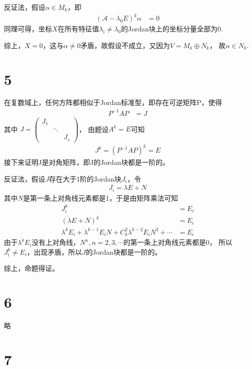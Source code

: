 \documentclass{article}
\begin{document}
反证法，假设$\alpha \in M_k$，即
\begin{align*}
  (\mathscr{A} - \lambda_0 E)^k \alpha & = 0
\end{align*}
同理可得，坐标$X$在所有特征值$\lambda_i \neq \lambda_0$的Jordan块上的坐标分量全部为0.

综上，$X = 0$，这与$\alpha \neq 0$矛盾，故假设不成立，又因为$V = M_k \oplus N_k$，
故$\alpha \in N_k$.

\section*{5}

在复数域上，任何方阵都相似于Jordan标准型，即存在可逆矩阵P，使得
\begin{align*}
  P^{-1} A P & = J
\end{align*}
其中
$J = \begin{pmatrix}
    J_1 &        &     \\
        & \ddots &     \\
        &        & J_s
  \end{pmatrix}$，
由题设$A^k = E$可知
\begin{align*}
  J^k = (P^{-1} A P)^k = E
\end{align*}
接下来证明J是对角矩阵，即J的Jordan块都是一阶的。

反证法，假设$J$存在大于1阶的Jordan块$J_i$，令
\begin{align*}
  J_i = \lambda E + N
\end{align*}
其中$N$是第一条上对角线元素都是1，于是由矩阵乘法可知
\begin{align*}
  J_i^k                                                                            & = E_i \\
  (\lambda E + N)^k                                                                & = E_i \\
  \lambda^k E_i + \lambda^{k - 1} E_i N + C_{k}^2 \lambda^{k - 2} E_i N^2 + \cdots & = E_i
\end{align*}
由于$\lambda^k E_i$没有上对角线，$N^n, n = 2, 3, \cdots$的第一条上对角线元素都是0，
所以$J_i^k \neq E_i$，出现矛盾，所以$J$的Jordan块都是一阶的。

综上，命题得证。

\section*{6}
略

\section*{7}
\end{document}
